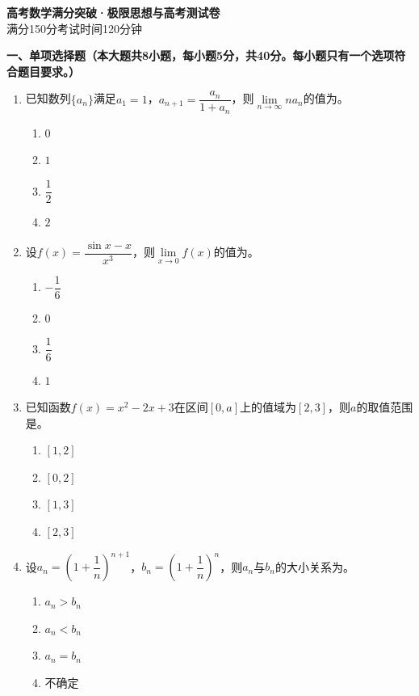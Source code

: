 \documentclass[12pt, a4paper]{ctexart}
\newcommand{\blank}[1]{\underline{\hspace{#1}}}
\begin{document}
\begin{center}
{\LARGE\bfseries 高考数学满分突破·极限思想与高考\quad 测试卷}\\[0.5em]
{\large 满分150分\quad 考试时间120分钟}
\end{center}

\vspace{1em}

\noindent\textbf{一、单项选择题（本大题共8小题，每小题5分，共40分。每小题只有一个选项符合题目要求。）}

\begin{enumerate}
\item 已知数列$\{a_n\}$满足$a_1=1$，$a_{n+1}=\dfrac{a_n}{1+a_n}$，则$\lim\limits_{n\to\infty}na_n$的值为\blank{3cm}。
\begin{enumerate}[label=\Alph*.]
\item $0$
\item $1$
\item $\dfrac{1}{2}$
\item $2$
\end{enumerate}

\item 设$f(x)=\dfrac{\sin x-x}{x^3}$，则$\lim\limits_{x\to 0}f(x)$的值为\blank{3cm}。
\begin{enumerate}[label=\Alph*.]
\item $-\dfrac{1}{6}$
\item $0$
\item $\dfrac{1}{6}$
\item $1$
\end{enumerate}

\item 已知函数$f(x)=x^2-2x+3$在区间$[0,a]$上的值域为$[2,3]$，则$a$的取值范围是\blank{3cm}。
\begin{enumerate}[label=\Alph*.]
\item $[1,2]$
\item $[0,2]$
\item $[1,3]$
\item $[2,3]$
\end{enumerate}

\item 设$a_n=\left(1+\dfrac{1}{n}\right)^{n+1}$，$b_n=\left(1+\dfrac{1}{n}\right)^{n}$，则$a_n$与$b_n$的大小关系为\blank{3cm}。
\begin{enumerate}[label=\Alph*.]
\item $a_n > b_n$
\item $a_n < b_n$
\item $a_n = b_n$
\item 不确定
\end{enumerate}


\end{enumerate}
\end{document}
